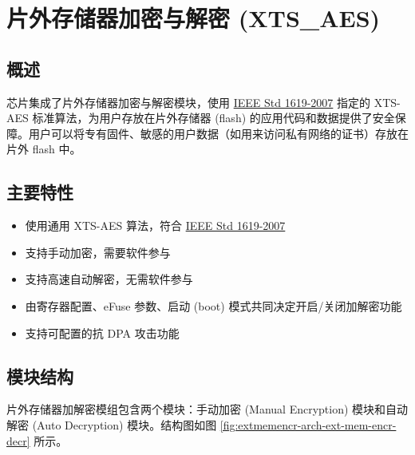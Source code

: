 \documentclass[main\_\_CN.tex]{subfiles}
\begin{document}

\ifglobal
\else
    {\let\clearpage\relax \listoftodos}
    \tableofcontents
\fi




\hypertarget{extmemencr}{}
\chapter{片外存储器加密与解密 (XTS\_AES)}
\label{mod:extmemencr}


\section{概述}

\chipname{} 芯片集成了片外存储器加密与解密模块，使用 \href{https://ieeexplore.ieee.org/document/4493450}{IEEE Std 1619-2007} 指定的 XTS-AES 标准算法，为用户存放在片外存储器 (flash) 的应用代码和数据提供了安全保障。用户可以将专有固件、敏感的用户数据（如用来访问私有网络的证书）存放在片外 flash 中。


\section{主要特性}

\begin{itemize}
    \item 使用通用 XTS-AES 算法，符合 \href{https://ieeexplore.ieee.org/document/4493450}{IEEE Std 1619-2007}
    \item 支持手动加密，需要软件参与
    \item 支持高速自动解密，无需软件参与
    \item 由寄存器配置、eFuse 参数、启动 (boot) 模式共同决定开启/关闭加解密功能
    \item 支持可配置的抗 DPA 攻击功能
\end{itemize}


\section{模块结构}
片外存储器加解密模组包含两个模块：手动加密 (Manual Encryption) 模块和自动解密 (Auto Decryption) 模块。结构图如图 \ref{fig:extmemencr-arch-ext-mem-encr-decr} 所示。
\end{document}
